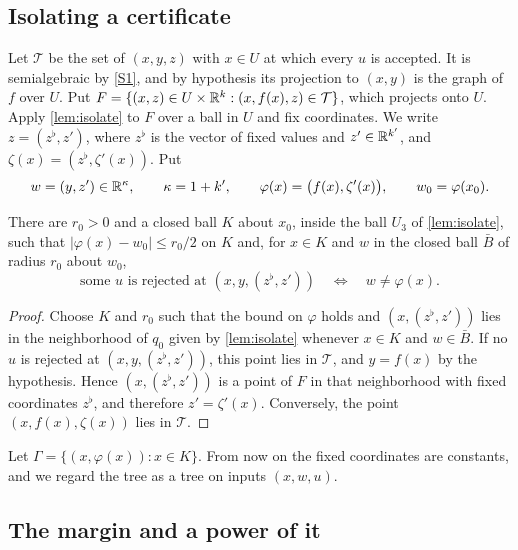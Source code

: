\subsection{Isolating a certificate}

Let $\mathcal T$ be the set of $(x,y,z)$ with $x\in U$ at which every $u$ is accepted. It is semialgebraic by \ref{S1}, and by hypothesis its projection to $(x,y)$ is the graph of $f$ over $U$. Put $F=\{(x,z)\in U\times\mathbb{R}^k:(x,f(x),z)\in\mathcal T\}$, which projects onto $U$. Apply \cref{lem:isolate} to $F$ over a ball in $U$ and fix coordinates. We write $z=(z^\flat,z')$, where $z^\flat$ is the vector of fixed values and $z'\in\mathbb{R}^{k'}$, and $\zeta(x)=(z^\flat,\zeta'(x))$. Put
\[
w=(y,z')\in\mathbb{R}^\kappa,\qquad\kappa=1+k',\qquad\varphi(x)=\bigl(f(x),\zeta'(x)\bigr),\qquad w_0=\varphi(x_0).
\]

\begin{lemma}\label{lem:goodz}
There are $r_0>0$ and a closed ball $K$ about $x_0$, inside the ball $U_3$ of \cref{lem:isolate}, such that $|\varphi(x)-w_0|\le r_0/2$ on $K$ and, for $x\in K$ and $w$ in the closed ball $\bar B$ of radius $r_0$ about $w_0$,
\[
\text{some }u\text{ is rejected at }(x,y,(z^\flat,z'))\quad\Longleftrightarrow\quad w\ne\varphi(x).
\]
\end{lemma}

\begin{proof}
Choose $K$ and $r_0$ such that the bound on $\varphi$ holds and $(x,(z^\flat,z'))$ lies in the neighborhood of $q_0$ given by \cref{lem:isolate} whenever $x\in K$ and $w\in\bar B$. If no $u$ is rejected at $(x,y,(z^\flat,z'))$, this point lies in $\mathcal T$, and $y=f(x)$ by the hypothesis. Hence $(x,(z^\flat,z'))$ is a point of $F$ in that neighborhood with fixed coordinates $z^\flat$, and therefore $z'=\zeta'(x)$. Conversely, the point $(x,f(x),\zeta(x))$ lies in $\mathcal T$.
\end{proof}

Let $\Gamma=\{(x,\varphi(x)):x\in K\}$. From now on the fixed coordinates are constants, and we regard the tree as a tree on inputs $(x,w,u)$.

\subsection{The margin and a power of it}


